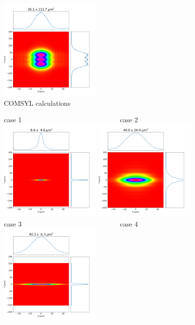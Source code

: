 \documentclass{iucr}              %
\begin{document}
\begin{figure}
    \includegraphics[width=0.45\textwidth]{figures/case4_comsyl.png}
    \caption{COMSYL calculations}
\end{figure}

\begin{figure}\label{fig:srw}
    \centering
    case 1~~~~~~~~~~~~~~~~~~~~~~~~~~~~~case 2\\
    \includegraphics[width=0.45\textwidth]{figures/case1_srw.png}
    \includegraphics[width=0.45\textwidth]{figures/case2_srw.png}\\
    case 3~~~~~~~~~~~~~~~~~~~~~~~~~~~~~case 4\\
    \includegraphics[width=0.45\textwidth]{figures/case3_srw.png}

\end{figure}
\end{document}
